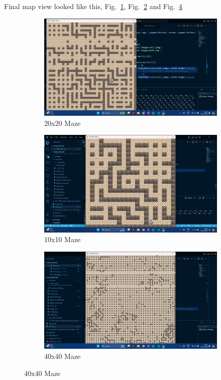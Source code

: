 \documentclass{article}
\begin{document}
\noindent Final map view looked like this, Fig.~\ref{fig:map3}, Fig.~\ref{fig:map4} and Fig.~\ref{fig:map5}

\begin{figure}[h]
    \caption[1]{}
    \centering
    \begin{subfigure}[b]{0.4\textwidth}
        \includegraphics[width=\textwidth]{screenshots/Screenshot (170).png}
        \caption[(a)]{20x20 Maze}
        \label{fig:map3}
    \end{subfigure}
    \hfil
    \begin{subfigure}[b]{0.4\textwidth}
        \includegraphics[width=\textwidth]{screenshots/Screenshot (172).png}
        \caption[(a)]{10x10 Maze}
        \label{fig:map4}
    \end{subfigure}
    \begin{subfigure}[r]{0.5\textwidth}
        \includegraphics[width=\textwidth]{screenshots/Screenshot (171).png}
        \caption[(a)]{40x40 Maze}
        \label{fig:map5}
    \end{subfigure}
\end{figure}
\end{document}
